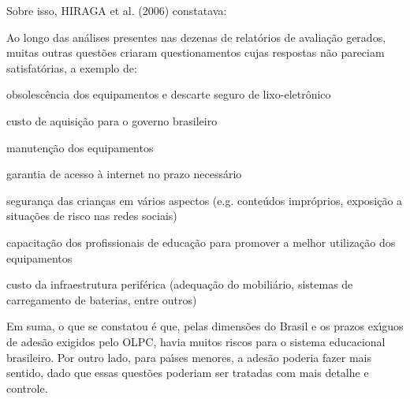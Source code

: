 \documentclass[
12pt,		%
openright,	%
twoside,  %
a4paper,			%
chapter=TITLE,		%
english,			%
french,				%
spanish,			%
brazil				%
]{USPSC-classe/USPSC}
\begin{document}
Sobre isso,  HIRAGA et al. (2006) constatava:









\noindent\begin{center}\mbox{\centering{}}\end{center}


Ao longo das an\'alises presentes nas dezenas de relat\'orios de avalia\c{c}\~ao gerados, muitas outras quest\~oes criaram questionamentos cujas respostas n\~ao pareciam satisfat\'orias, a exemplo de:









\begin{alineas}
\item obsolesc\^encia dos equipamentos e descarte seguro de lixo-eletr\^onico
\item custo de aquisi\c{c}\~ao para o governo brasileiro
\item manuten\c{c}\~ao dos equipamentos
\item garantia de acesso \`a internet no prazo necess\'ario
\item seguran\c{c}a das crian\c{c}as em v\'arios aspectos (e.g. conte\'udos impr\'oprios, exposi\c{c}\~ao a situa\c{c}\~oes de risco nas redes sociais)
\item capacita\c{c}\~ao dos profissionais de educa\c{c}\~ao para promover a melhor utiliza\c{c}\~ao dos equipamentos
\item custo da infraestrutura perif\'erica (adequa\c{c}\~ao do mobili\'ario, sistemas de carregamento de baterias, entre outros)
\end{alineas}

Em suma, o que se constatou \'e que, pelas dimens\~oes do Brasil e os prazos ex\'{\i}guos de ades\~ao exigidos pelo OLPC, havia muitos riscos para o sistema educacional brasileiro. Por outro lado, para pa\'{\i}ses menores, a ades\~ao poderia fazer mais sentido, dado que essas quest\~oes poderiam ser tratadas com mais detalhe e controle.
\end{document}
